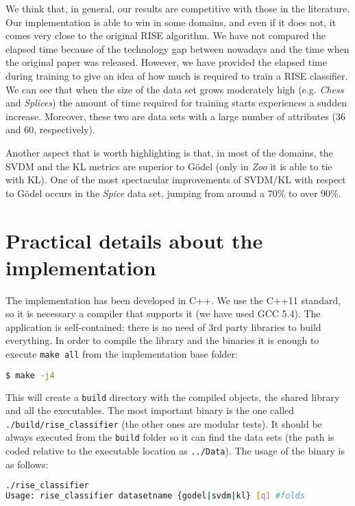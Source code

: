\documentclass[a4paper]{article}
\begin{document}
We think that, in general, our results are competitive with those in the literature. Our implementation is able to win in some domains, and even if it does not, it comes very close to the original RISE algorithm. We have not compared the elapsed time because of the technology gap between nowadays and the time when the original paper was released. However, we have provided the elapsed time during training to give an idea of how much is required to train a RISE classifier. We can see that when the size of the data set grows moderately high (e.g. \emph{Chess} and \emph{Splices}) the amount of time required for training starts experiences a sudden increase. Moreover, these two are data sets with a large number of attributes (36 and 60, respectively).

Another aspect that is worth highlighting is that, in most of the domains, the SVDM and the KL metrics are superior to G\"odel (only in \emph{Zoo} it is able to tie with KL). One of the most spectacular improvements of SVDM/KL with respect to G\"odel occurs in the \emph{Spice} data set, jumping from around a 70\% to over 90\%.

\section{Practical details about the implementation}

The implementation has been developed in C++. We use the C++11 standard, so it is necessary a compiler that supports it (we have used GCC 5.4). The application is self-contained: there is no need of 3rd party libraries to build everything. In order to compile the library and the binaries it is enough to execute \texttt{make all} from the implementation base folder:
\begin{lstlisting}[language=bash,frame=single]
$ make -j4
\end{lstlisting}

This will create a \texttt{build} directory with the compiled objects, the shared library and all the executables. The most important binary is the one called \texttt{./build/rise\_classifier} (the other ones are modular tests). It should be always executed from the \texttt{build} folder so it can find the data sets (the path is coded relative to the executable location as \texttt{../Data}). The usage of the binary is as follows:
\begin{lstlisting}[language=bash,frame=single]
./rise_classifier 
Usage: rise_classifier datasetname {godel|svdm|kl} [q] #folds
\end{lstlisting}
\end{document}
